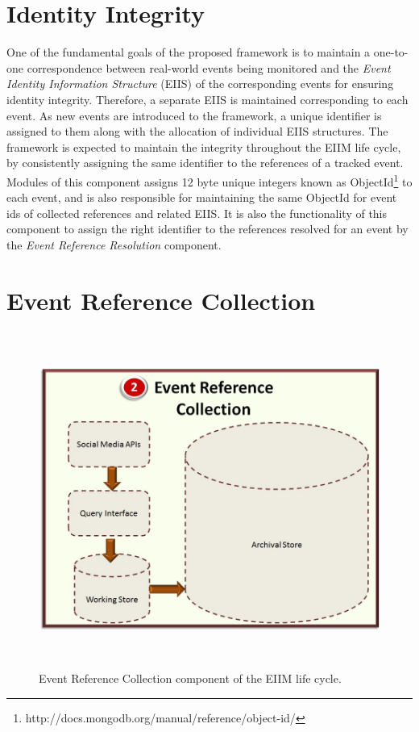 \section{Identity Integrity}
One of the fundamental goals of the proposed framework is to maintain a one-to-one correspondence between real-world events being monitored and the \textit{Event Identity Information Structure} (EIIS) of the corresponding events for ensuring identity integrity. Therefore, a separate EIIS is maintained corresponding to each event. As new events are introduced to the framework, a unique identifier is assigned to them along with the allocation of individual EIIS structures. The framework is expected to maintain the integrity throughout the EIIM life cycle, by consistently assigning the same identifier to the references of a tracked event. Modules of this component assigns 12 byte unique integers known as ObjectId\footnote{http://docs.mongodb.org/manual/reference/object-id/}  to each event, and is also responsible for maintaining the same ObjectId for event ids of collected references and related EIIS. It is also the functionality of this component to assign the right identifier to the references resolved for an event by the \textit{Event Reference Resolution} component.


\section{Event Reference Collection\label{eventreferencecollection}}

\begin{figure}[htbp]
  \caption{Event Reference Collection component of the EIIM life cycle.}
  \centering
    \includegraphics[width=14cm,height=11cm]{Figures/EventReferenceCollection.jpg}
\end{figure}

